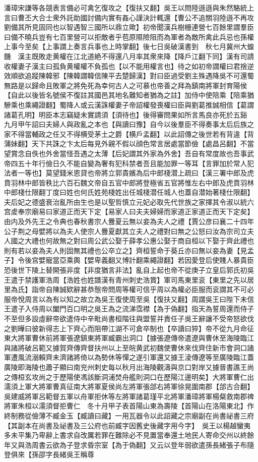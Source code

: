 潘璋宋謙等各競表言備必可禽乞復攻之【復扶又翻】吳王以問陸遜遜與朱然駱統上言曰曹丕大合士衆外託助國討備内實有姦心謹決計輒還【曹公不追關羽陸遜不再攻劉備其所見固同也以智遇智三國所以鼎立歟】初帝聞漢兵樹栅連營七百餘里謂羣臣曰備不曉兵豈有七百里營可以拒敵者乎苞原隰險阻而為軍者為敵所禽此兵忌也孫權上事今至矣【上事謂上奏言兵事也上時掌翻】後七日吳破漢書到　秋七月冀州大蝗饑　漢主既敗走黄權在江北道絶不得還八月率其衆來降【降戶江翻下同】漢有司請收權妻子漢主曰孤負黄權權不負孤也【以不能用權言也】待之如初帝謂權曰君捨逆效順欲追蹤陳韓邪【陳韓謂韓信陳平去楚歸漢】對曰臣過受劉主殊遇降吳不可還蜀無路是以歸命且敗軍之將免死為幸何古人之可慕也帝善之拜為鎮南將軍封育陽侯【自此以後皆名號侯不復註其國邑其地名難知者猶為之註】加侍中使陪乘【陪乘猶驂乘也乘繩證翻】蜀降人或云漢誅權妻子帝詔權發喪權曰臣與劉葛推誠相信【葛謂諸葛孔明】明臣本志竊疑未實請須【須待也】後得審問果如所言馬良亦死於五谿　九月甲午詔曰夫婦人與政亂之本也【與讀曰豫】自今以後羣臣不得奏事太后后族之家不得當輔政之任又不得横受茅土之爵【横戶孟翻】以此詔傳之後世若有背違【背蒲妹翻】天下共誅之卞太后每見外親不假以顔色常言居處當節儉【處昌呂翻】不當望賞念自佚也外舍當怪吾遇之太薄【后妃謂其外家為外舍】吾自有常度故也吾事武帝四五十年行儉日久不能自變為奢有犯科禁者吾且能加罪一等耳【言罪加於常人犯法者一等也】莫望錢米恩貸也帝將立郭貴嬪為后中郎棧潜上疏曰【漢三署中郎及虎賁羽林中郎皆秩比六百石魏文帝自五官中郎將登極省五官將惟左右中郎及虎賁羽林中郎棧仕限翻丁度曰姓也何氏姓苑棧姓出任城棧潜任城人也蓋自潜始著棧仕限翻】夫后妃之德盛衰治亂所由生也是以聖哲慎立元妃必取先代世族之家擇其令淑以統六宫䖍奉宗廟易曰家道正而天下定【易家人曰夫夫婦婦而家道正家道正而天下定矣】由内及外先王之令典也春秋書宗人釁夏云無以妾為夫人之禮【賈公彦曰襄二十四年公子荆之母嬖將以為夫人使宗人釁夏獻其立夫人之禮對曰無之公怒曰汝為宗司立夫人國之大禮也何故無之對曰周公武公娶于薛孝公惠公娶于商自桓以下娶于齊此禮也則有若以妾為夫人則固無其禮也公卒立之】齊桓誓命于葵丘亦曰無以妾為妻【見孟子】令後宫嬖寵當亞乘輿【嬖卑義翻又博計翻乘繩證翻】若因愛登后使賤人暴貴臣恐後世下陵上替開張非度【非度猶言非法】亂自上起也帝不從庚子立皇后郭氏初吳王遣于禁護軍浩周【浩姓也姓譜漢有青州刺史浩賞】軍司馬東里衮【東里之先以居里為氏】詣帝自陳誠欵辭甚恭慤帝問周等權可信乎周以為權必臣服而衮謂其不可必服帝悅周言以為有以知之故立為吳王復使周至吳【復扶又翻】周謂吳王曰陛下未信王遣子入侍周以闔門百口明之吳王為之流涕霑襟【為于偽翻】指天為誓周還而侍子不至但多設虛辭帝欲遣侍中辛毗尚書桓階往與盟誓并責任子吳王辭讓不受帝怒欲伐之劉曄曰彼新得志上下齊心而阻帶江湖不可倉卒制也【卒讀曰猝】帝不從九月命征東大將軍曹休前將軍張遼鎮東將軍臧霸出洞口【據張遼傳帝遣遼與曹休至海陵臨江與諸將破呂範又據賀齊傳齊督扶州以上至皖黄武初魏使曹休來伐齊住新市會洞口諸軍遭風流溺賴齊未濟諸將倚以為勢休等憚之遂引軍還又據王淩傳遼等至廣陵臨江蓋廣陵即海陵也蕭子顯曰南兖州刺史每以秋月出海陵觀濤與京口對岸又據晉書譙王尚之傳桓玄攻尚之于歷陽使馮該斷洞浦焚舟艦則洞口在歷陽江邊明矣】大將軍曹仁出濡須上軍大將軍曹真征南大將軍夏侯尚左將軍張郃右將軍徐晃圍南郡【郃古合翻】吳建威將軍呂範督五軍以舟軍拒休等左將軍諸葛瑾平北將軍潘璋將軍楊粲救南郡禆將軍朱桓以濡須督拒曹仁　冬十月甲子表首陽山東為壽陵【首陽山在洛陽東北】作終制務從儉薄不臧金玉【臧讀曰藏】一用瓦器令以此詔藏之宗廟副在尚書祕書三府【其副本在尚書及祕書及三公府也前臧字因舊史後藏字用今字】　吳王以楊越蠻夷多未平集乃卑辭上書求自改厲若罪在難除必不見置當奉還土地民人寄命交州以終餘年又與浩周書云欲為子登求昏宗室【為于偽翻】又云以登年弱欲遣孫長緒張子布隨登俱來【孫邵字長緒吳王稱尊